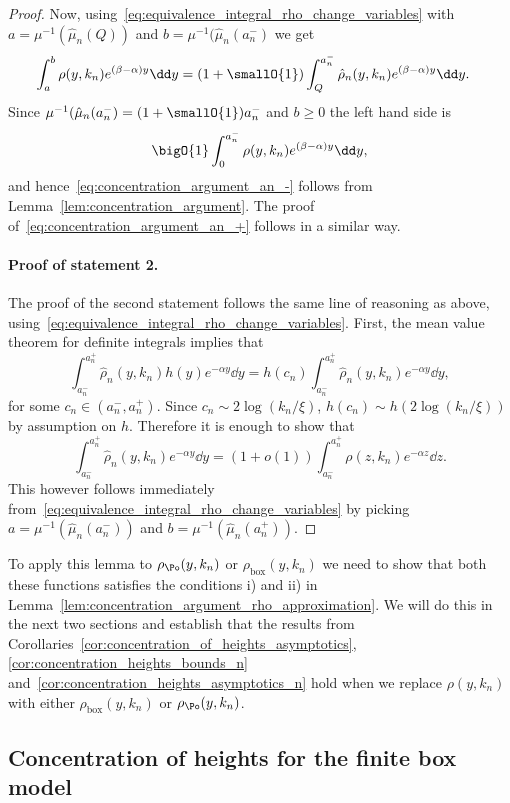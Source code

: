 \begin{proof}
Now, using~\eqref{eq:equivalence_integral_rho_change_variables} with $a = \mu^{-1}(\hat{\mu}_n(Q))$ and $b = \mu^{-1}(\hat{\mu}_n(a_n^-)$ we get
\begin{align*}
	\int_a^b \rho(y,k_n) e^{(\beta-\alpha) y} \dd y
	&= (1+\smallO{1}) \int_{Q}^{a_n^-} \hat{\rho}_n(y,k_n) e^{(\beta - \alpha)y} \dd y.
\end{align*}
Since $\mu^{-1}(\hat{\mu}_n(a_n^-) = (1+\smallO{1})a_n^-$ and $b \ge 0$ the left hand side is
\[
	\bigO{1} \int_0^{a_n^-} \rho(y,k_n) e^{(\beta-\alpha) y} \dd y,
\]
and hence~\eqref{eq:concentration_argument_an_-} follows from Lemma~\ref{lem:concentration_argument}. The proof of~\eqref{eq:concentration_argument_an_+} follows in a similar way.

\paragraph{Proof of statement 2.}

The proof of the second statement follows the same line of reasoning as above, using~\eqref{eq:equivalence_integral_rho_change_variables}. First, the mean value theorem for definite integrals implies that
\[
	\int_{a_n^-}^{a_n^+} \hat{\rho}_n(y,k_n) h(y) e^{-\alpha y} \dd y
	= h(c_n) \int_{a_n^-}^{a_n^+} \hat{\rho}_n(y,k_n) e^{-\alpha y} \dd y,
\]
for some $c_n \in (a_n^-, a_n^+)$. Since $c_n \sim 2 \log(k_n/\xi)$, $h(c_n)\sim h(2\log(k_n/\xi))$ by assumption on $h$. 
Therefore it is enough to show that
\[
	\int_{a_n^-}^{a_n^+} \hat{\rho}_n(y,k_n) e^{-\alpha y} \dd y
	= \left(1 + o(1)\right) \int_{a_n^-}^{a_n^+} \rho(z,k_n) e^{-\alpha z} \dd z.
\] 
This however follows immediately from~\eqref{eq:equivalence_integral_rho_change_variables} by picking $a = \mu^{-1}(\hat{\mu}_n(a_n^-))$ and $b = \mu^{-1}(\hat{\mu}_n(a_n^+))$.
\end{proof}

To apply this lemma to $\rho_{\Po}(y,k_n)$ or $\rho_{\text{box}}(y,k_n)$ we need to show that both these functions satisfies the conditions i) and ii) in Lemma~\ref{lem:concentration_argument_rho_approximation}. We will do this in the next two sections and establish that the results from Corollaries~\ref{cor:concentration_of_heights_asymptotics}, \ref{cor:concentration_heights_bounds_n}
and~\ref{cor:concentration_heights_asymptotics_n} hold when we replace $\rho(y,k_n)$ with either $\rho_{\text{box}}(y,k_n)$
or $\rho_{\Po}(y,k_n)$. 



\subsection{Concentration of heights for the finite box model}\label{ssec:average_degree_P_n}

